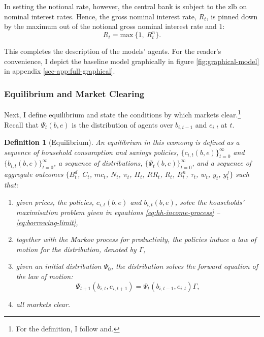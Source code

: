 \documentclass[12pt]{article} %
\numberwithin{equation}{section} %
\numberwithin{figure}{section}
\numberwithin{table}{section}
\newtheorem{definition}{Definition}
\begin{document}
In setting the notional rate, however, the central bank is subject to the \Gls{zlb} on nominal interest rates. Hence, the gross nominal interest rate, $R_t$, is pinned down by the maximum out of the notional gross nominal interest rate and $1$: 
\begin{equation}
    R_t = \text{max} \ \{ 1, \ R_{t}^n \}. \label{eq:zlb}
\end{equation}


This completes the description of the models' agents. For the reader's convenience, I depict the baseline model graphically in figure \ref{fig:graphical-model} in appendix \ref{sec-app:full-graphical}.

\subsubsection{Equilibrium and Market Clearing}
\label{sec:model-eq}

Next, I define equilibrium and state the conditions by which markets clear.\footnote{For the definition, I follow \textcite{gl2017} and.} Recall that $\Psi_t (b,e)$ is the distribution of agents over $b_{i,t-1}$ and $e_{i,t}$ at $t$.

\begin{definition}[Equilibrium]
\label{def:eq}
An equilibrium in this economy is defined as a sequence of household consumption and savings policies, $\{ c_{i,t} (b, e) \}_{t=0}^{\infty}$ and $\{ b_{i,t} (b, e) \}_{t=0}^{\infty}$, a sequence of distributions, $\{ \Psi_t (b,e) \}_{t=0}^{\infty} $, and a sequence of aggregate outcomes $\{ B_t^d$, $C_t$, $mc_t$, $N_t$, $\pi_t$, $\Pi_t$, $RR_t$, $R_t$, $R_t^n$, $\tau_t$, $w_t$, $y_t$, $y_t^f \}$ such that:
\begin{enumerate}
    \item given prices, the policies, $c_{i,t} (b, e)$ and $b_{i,t} (b, e)$, solve the households' maximisation problem given in equations \eqref{eq:hh-income-process} -- \eqref{eq:borrowing-limit},
    \item together with the Markov process for productivity, the policies induce a law of motion for the distribution, denoted by $\Gamma$,
    \item given an initial distribution $\Psi_0$, the distribution solves the forward equation of the law of motion:
    \begin{equation*}
        \Psi_{t+1} (b_{i,t},e_{i,t+1}) = \Psi_{t} (b_{i,t-1},e_{i,t}) \Gamma,
    \end{equation*}
    \item all markets clear.
\end{enumerate}
\end{definition}
\end{document}
